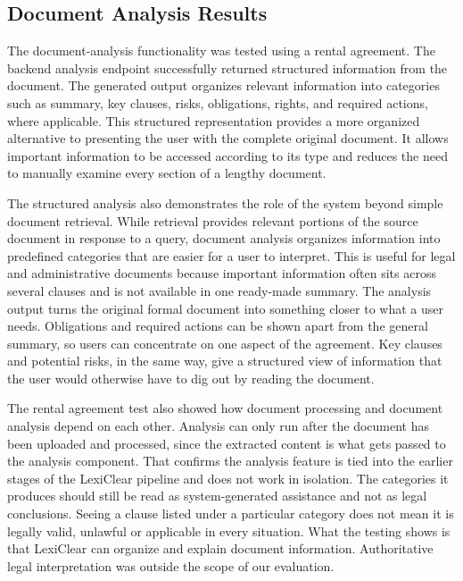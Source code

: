 \documentclass[12pt,a4paper,oneside]{report}
\begin{document}
\subsection{Document Analysis Results}
The document-analysis functionality was tested using a rental agreement. The backend analysis endpoint successfully returned structured information from the document. The generated output organizes relevant information into categories such as summary, key clauses, risks, obligations, rights, and required actions, where applicable. This structured representation provides a more organized alternative to presenting the user with the complete original document. It allows important information to be accessed according to its type and reduces the need to manually examine every section of a lengthy document.

The structured analysis also demonstrates the role of the system beyond simple document retrieval. While retrieval provides relevant portions of the source document in response to a query, document analysis organizes information into predefined categories that are easier for a user to interpret. This is useful for legal and administrative documents because important information often sits across several clauses and is not available in one ready-made summary. The analysis output turns the original formal document into something closer to what a user needs. Obligations and required actions can be shown apart from the general summary, so users can concentrate on one aspect of the agreement. Key clauses and potential risks, in the same way, give a structured view of information that the user would otherwise have to dig out by reading the document.

The rental agreement test also showed how document processing and document analysis depend on each other. Analysis can only run after the document has been uploaded and processed, since the extracted content is what gets passed to the analysis component. That confirms the analysis feature is tied into the earlier stages of the LexiClear pipeline and does not work in isolation. The categories it produces should still be read as system-generated assistance and not as legal conclusions. Seeing a clause listed under a particular category does not mean it is legally valid, unlawful or applicable in every situation. What the testing shows is that LexiClear can organize and explain document information. Authoritative legal interpretation was outside the scope of our evaluation.
\end{document}
